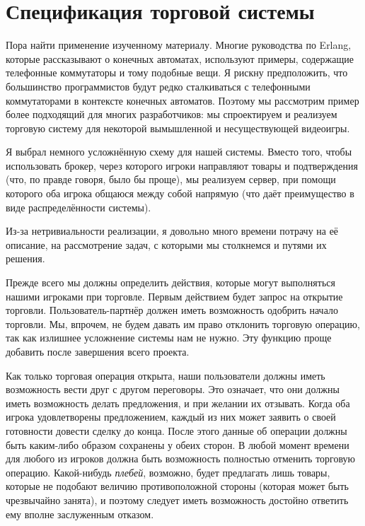 \section{Спецификация торговой системы}
\label{a-trading-system-specification}

Пора найти применение изученному материалу.
Многие руководства по Erlang, которые рассказывают о конечных автоматах, используют примеры, содержащие телефонные коммутаторы и тому подобные вещи.
Я рискну предположить, что большинство программистов будут редко сталкиваться с телефонными коммутаторами в контексте конечных автоматов.
Поэтому мы рассмотрим пример более подходящий для многих разработчиков: мы спроектируем и реализуем торговую систему для некоторой вымышленной и несуществующей видеоигры.

Я выбрал немного усложнённую схему для нашей системы.
Вместо того, чтобы использовать брокер, через которого игроки направляют товары и подтверждения (что, по правде говоря, было бы проще), мы реализуем сервер, при помощи которого оба игрока общаюся между собой напрямую (что даёт преимущество в виде распределённости системы).

Из\--за нетривиальности реализации, я довольно много времени потрачу на её описание, на рассмотрение задач, с которыми мы столкнемся и путями их решения.

Прежде всего мы должны определить действия, которые могут выполняться нашими игроками при торговле.
Первым действием будет запрос на открытие торговли.
Пользователь\--партнёр должен иметь возможность одобрить начало торговли.
Мы, впрочем, не будем давать им право отклонить торговую операцию, так как излишнее усложнение системы нам не нужно.
Эту функцию проще добавить после завершения всего проекта.

Как только торговая операция открыта, наши пользователи должны иметь возможность вести друг с другом переговоры.
Это означает, что они должны иметь возможность делать предложения, и при желании их отзывать.
Когда оба игрока удовлетворены предложением, каждый из них может заявить о своей готовности довести сделку до конца.
После этого данные об операции должны быть каким\--либо образом сохранены у обеих сторон.
В любой момент времени для любого из игроков должна быть возможность полностью отменить торговую операцию.
Какой\--нибудь \emph{плебей}, возможно, будет предлагать лишь  товары, которые не подобают величию противоположной стороны (которая может быть чрезвычайно занята), и поэтому следует иметь возможность достойно ответить ему вполне заслуженным отказом.


